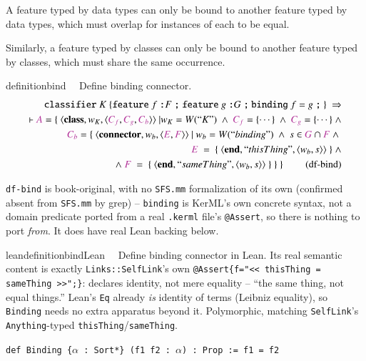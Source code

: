 \pn A feature typed by data types can only be bound to another feature typed by data types, which must overlap for instances of each to be equal.

\pn Similarly, a feature typed by classes can only be bound to another feature typed by classes, which must share the same occurrence. 


\begin{restatable}{definition}{bind}~~   Define binding connector.
\begin{align}
\texttt{classifier}~K~\{ %
\texttt{feature}~f~\texttt{:} F~\texttt{;} ~%
\texttt{feature}~g~\texttt{:} G~\texttt{;} ~%
\texttt{binding}~ f=g~\texttt{;}~%
\}~\Rightarrow  \notag \\
\vdash \mc{A} = \{~\langle \textbf{class},w_K,\langle \mc{C_f},\mc{C_g},\mc{C_b}\rangle\rangle~\vert %
w_K=W(``K")~ \wedge~\mc{C_f}=\{\cdots\}~\wedge~\mc{C_g}=\{\cdots\}~\wedge \notag \\
\mc{C_b}=\{~\langle \textbf{connector},w_b,\langle \mc{E},\mc{F}\rangle\rangle ~\vert~
w_b=W(``binding")~ \wedge 
~s\in \mc{G}\cap \mc{F}~\wedge~\notag \\
\mc{E}~=~\{~\langle\textbf{end},``thisThing",\langle w_b,s \rangle\rangle~\}~\wedge \notag \\
~\wedge~\mc{F}~=~\{~\langle\textbf{end},``sameThing",\langle w_b,s \rangle\rangle~\}~\}~\}~\label{eq:df-bind}\tag{df-bind}
\end{align}
\end{restatable}

\pn \texttt{df-bind} is book-original, with no \texttt{SFS.mm} formalization of its own (confirmed
absent from \texttt{SFS.mm} by grep) -- \texttt{binding} is KerML's own concrete syntax, not a
domain predicate ported from a real \texttt{.kerml} file's \texttt{@Assert}, so there is nothing to
port \emph{from}. It does have real Lean backing below.

\begin{restatable}{leandefinition}{bindLean}~~ Define binding connector in Lean.
Its real semantic content is exactly \texttt{Links::SelfLink}'s own
\texttt{@Assert\{f="<< thisThing = sameThing >>";\}}: declares identity, not mere equality --
``the same thing, not equal things.'' Lean's \texttt{Eq} already \emph{is} identity of terms
(Leibniz equality), so \texttt{Binding} needs no extra apparatus beyond it. Polymorphic, matching
\texttt{SelfLink}'s \texttt{Anything}-typed \texttt{thisThing}/\texttt{sameThing}.

\texttt{\textcolor{leancolor}{def} \textcolor{leanyellow}{Binding} \{$\alpha$ : Sort*\} (f1 f2 : $\alpha$) : Prop := f1 = f2}
\label{Binding}
\end{restatable}

